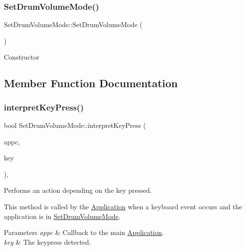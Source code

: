\subsubsection{\texorpdfstring{Set\+Drum\+Volume\+Mode()}{SetDrumVolumeMode()}}
{\footnotesize\ttfamily Set\+Drum\+Volume\+Mode\+::\+Set\+Drum\+Volume\+Mode (\begin{DoxyParamCaption}{ }\end{DoxyParamCaption})}

Constructor 

\subsection{Member Function Documentation}
\mbox{\label{classdrumpi_1_1SetDrumVolumeMode_a6b0029ed8934700699658f3b85a67639}} 
\subsubsection{\texorpdfstring{interpret\+Key\+Press()}{interpretKeyPress()}}
{\footnotesize\ttfamily bool Set\+Drum\+Volume\+Mode\+::interpret\+Key\+Press (\begin{DoxyParamCaption}\item[{\hyperlink{classdrumpi_1_1ApplicationCallback}{Application\+Callback} $\ast$}]{appc,  }\item[{int}]{key }\end{DoxyParamCaption})\hspace{0.3cm}{\ttfamily [override]}, {\ttfamily [virtual]}}



Performs an action depending on the key pressed. 

This method is called by the \hyperlink{classdrumpi_1_1Application}{Application} when a keyboard event occurs and the application is in \hyperlink{classdrumpi_1_1SetDrumVolumeMode}{Set\+Drum\+Volume\+Mode}. 
\begin{DoxyParams}{Parameters}
{\em appc} & Callback to the main \hyperlink{classdrumpi_1_1Application}{Application}. \\
\hline
{\em key} & The keypress detected. \\
\hline
\end{DoxyParams}


